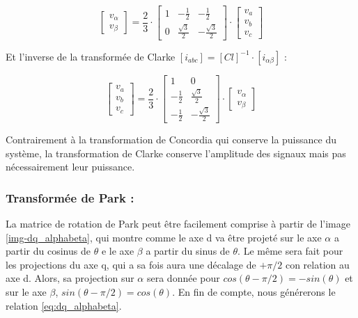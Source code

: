 \begin{equation}
    \begin{bmatrix}
        v_\alpha \\
        v_\beta
    \end{bmatrix} = 
    \frac{2}{3} \cdot 
    \begin{bmatrix}
        1 & -\frac{1}{2} & -\frac{1}{2} \\
        0 & \frac{\sqrt{3} }{2} & -\frac{\sqrt{3} }{2} 
    \end{bmatrix} \cdot
    \begin{bmatrix}
        v_a \\
        v_b \\
        v_c
    \end{bmatrix}
\end{equation}

Et l'inverse de la transformée de Clarke $\left[i_{abc} \right] = \left[Cl\right]^{-1} \cdot \left[i_{\alpha \beta} \right]$ :

\begin{equation}
    \begin{bmatrix}
        v_a \\
        v_b \\
        v_c
    \end{bmatrix} = 
    \frac{2}{3} \cdot 
    \begin{bmatrix}
        1 & 0 \\
        -\frac{1}{2} & \frac{\sqrt{3}}{2} \\
        -\frac{1}{2} & -\frac{\sqrt{3}}{2}
    \end{bmatrix} \cdot
    \begin{bmatrix}
        v_\alpha \\
        v_\beta 
    \end{bmatrix}
\end{equation}

Contrairement à la transformation de Concordia qui conserve la puissance du système, la transformation de Clarke conserve l'amplitude des signaux mais pas nécessairement leur puissance.

\FloatBarrier
\subsubsection{Transformée de Park :}

La matrice de rotation de Park peut être facilement comprise à partir de l'image \ref{img-dq_alphabeta}, qui montre comme le axe d va être projeté sur le axe $\alpha$ a partir du cosinus de $\theta$ e le axe $\beta$ a partir du sinus de $\theta$. Le même sera fait pour les projections du axe q, qui a sa fois aura une décalage de $+\pi/2$ con relation au axe d. Alors, sa projection sur $\alpha$ sera donnée pour $cos(\theta - \pi/2) = - sin(\theta)$ et sur le axe $\beta$, $sin(\theta - \pi/2) = cos(\theta)$. En fin de compte, nous générerons le relation \ref{eq:dq_alphabeta}. 

